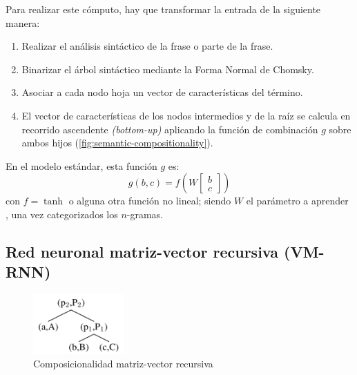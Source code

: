 Para realizar este cómputo, hay que transformar la entrada de la siguiente manera:
\nopagebreak
\begin{enumerate}
\item Realizar el análisis sintáctico de la frase o parte de la frase.
\item Binarizar el árbol sintáctico mediante la Forma Normal de Chomsky.
\item Asociar a cada nodo hoja un vector de características del término.
\item El vector de características de los nodos intermedios y de la raíz se calcula en recorrido ascendente \emph{(bottom-up)} aplicando la función de combinación $g$ sobre ambos hijos (\autoref{fig:semantic-compositionality}).
\end{enumerate}

En el modelo estándar, esta función $g$ es:
\begin{equation}
g(b, c) = f\left(W \left[\begin{array}{c}b \\c\end{array}\right] \right)
\end{equation}
con $f=\tanh$ o alguna otra función no lineal; siendo $W$ el parámetro a aprender \citep{Socher2013}, una vez categorizados los $n$-gramas.

\FloatBarrier
\subsection{Red neuronal matriz-vector recursiva (VM-RNN)} 

\begin{figure}[htbp]
\centering
\includegraphics[width=3.5cm]{semantic-compositionality-vm}
\caption[Composicionalidad matriz-vector recursiva]{Composicionalidad matriz-vector recursiva \citep{Socher2013}}
\label{fig:semantic-compositionality-vm}
\end{figure}

